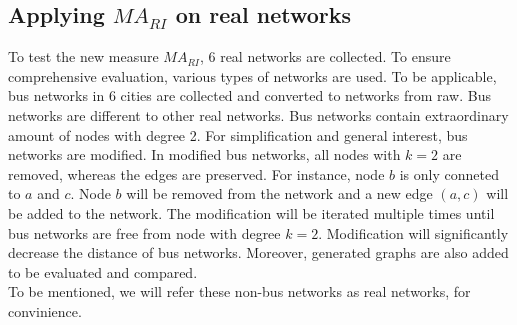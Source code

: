 \documentclass[12pt]{article}
\begin{document}
{\subsection{Applying $MA_{RI}$ on real networks}
To test the new measure $MA_{RI}$, 6 real networks are collected. To ensure comprehensive evaluation, various types of networks are used. To be applicable, bus networks in 6 cities are collected and converted to networks from raw. Bus networks are different to other real networks. Bus networks contain extraordinary amount of nodes with degree 2. For simplification and general interest, bus networks are modified. In modified bus networks, all nodes with $k=2$ are removed, whereas the edges are preserved. For instance, node $b$ is only conneted to $a$ and $c$. Node $b$ will be removed from the network and a new edge $(a,c)$ will be added to the network. The modification will be iterated multiple times until bus networks are free from node with degree $k=2$. Modification will significantly decrease the distance of bus networks. Moreover, generated graphs are also added to be evaluated and compared.\\
To be mentioned, we will refer these non-bus networks as real networks, for convinience.

}
\end{document}

